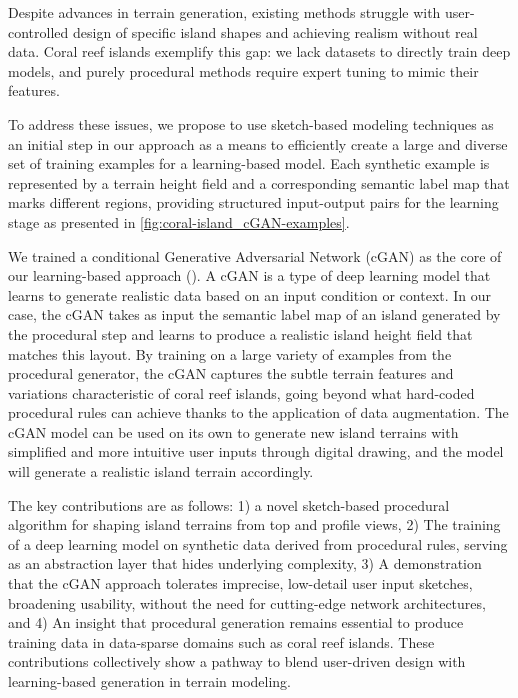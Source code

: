 Despite advances in terrain generation, existing methods struggle with user-controlled design of specific island shapes and achieving realism without real data. Coral reef islands exemplify this gap: we lack datasets to directly train deep models, and purely procedural methods require expert tuning to mimic their features.

To address these issues, we propose to use sketch-based modeling techniques as an initial step in our approach as a means to efficiently create a large and diverse set of training examples for a learning-based model. Each synthetic example is represented by a terrain height field and a corresponding semantic label map that marks different regions, providing structured input-output pairs for the learning stage as presented in \cref{fig:coral-island_cGAN-examples}.

We trained a conditional Generative Adversarial Network (cGAN) as the core of our learning-based approach (\cite{Mirza2014,Isola2017}). A cGAN is a type of deep learning model that learns to generate realistic data based on an input condition or context. In our case, the cGAN takes as input the semantic label map of an island generated by the procedural step and learns to produce a realistic island height field that matches this layout. By training on a large variety of examples from the procedural generator, the cGAN captures the subtle terrain features and variations characteristic of coral reef islands, going beyond what hard-coded procedural rules can achieve thanks to the application of data augmentation. The cGAN model can be used on its own to generate new island terrains with simplified and more intuitive user inputs through digital drawing, and the model will generate a realistic island terrain accordingly.

The key contributions are as follows: 1) a novel sketch-based procedural algorithm for shaping island terrains from top and profile views, 2) The training of a deep learning model on synthetic data derived from procedural rules, serving as an abstraction layer that hides underlying complexity, 3) A demonstration that the cGAN approach tolerates imprecise, low-detail user input sketches, broadening usability, without the need for cutting-edge network architectures, and 4) An insight that procedural generation remains essential to produce training data in data-sparse domains such as coral reef islands. 
These contributions collectively show a pathway to blend user-driven design with learning-based generation in terrain modeling.